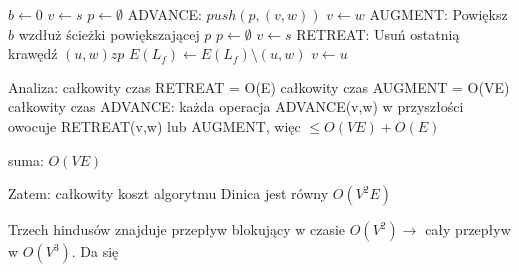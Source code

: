 \begin{algorithmic}
    \State $b \gets 0$
    \State $v \gets s$
    \State $p \gets \emptyset$
            \State ADVANCE:
            \State $push(p, (v,w))$
            \State $v \gets w$
                \State AUGMENT:
                \State Powiększ $b$ wzdłuż ścieżki powiększającej $p$
                \State $p \gets \emptyset$
                \State $ v \gets s $
            \Else
                \State RETREAT:
                \State Usuń ostatnią krawędź $(u,w) z p$
                \State $E(L_f) \gets E(L_f) \setminus {(u,w)}$
                \State $v \gets u$
            \EndIf
        \EndIf
    \EndWhile

\end{algorithmic}

Analiza:
całkowity czas RETREAT = O(E)
całkowity czas AUGMENT = O(VE)
całkowity czas ADVANCE: każda operacja ADVANCE(v,w) w przyszłości owocuje RETREAT(v,w) lub AUGMENT, więc $\le O(VE) + O(E)$

suma: $O(VE)$

Zatem:
całkowity koszt algorytmu Dinica jest równy $O(V^2E)$


Trzech hindusów znajduje przepływ blokujący w czasie $O(V^2) \rightarrow $ cały przepływ w $O(V^3)$. Da się 

